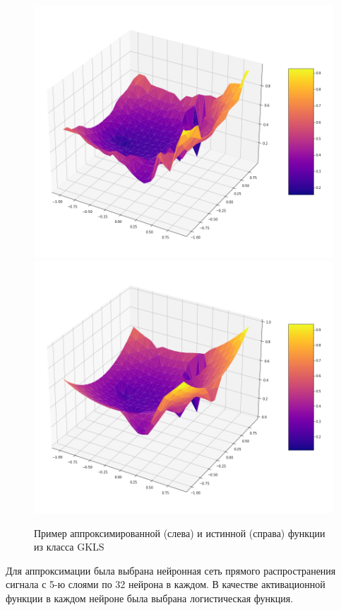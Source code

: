 \documentclass[11pt, oneside, a4paper]{article}
\begin{document}
\begin{figure}[h]
	\begin{center}
			\includegraphics[scale=0.25]{figure/approximate}
			\includegraphics[scale=0.25]{figure/true}			
			\caption{Пример аппроксимированной (слева) и истинной (справа) функции из класса GKLS} %
            \label{fio_ris1}
	\end{center}
\end{figure}


Для аппроксимации была выбрана нейронная сеть прямого распространения сигнала с 5-ю слоями по 32 нейрона в каждом. В качестве активационной функции в каждом нейроне была выбрана логистическая функция. 
\end{document}
